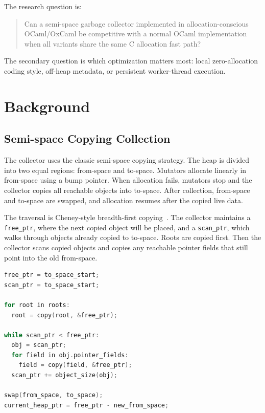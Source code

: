 \documentclass[11pt,a4paper]{article}
\begin{document}
The research question is:

\begin{quote}
Can a semi-space garbage collector implemented in allocation-conscious
OCaml/OxCaml be competitive with a normal OCaml implementation when all variants
share the same C allocation fast path?
\end{quote}

The secondary question is which optimization matters most: local zero-allocation
coding style, off-heap metadata, or persistent worker-thread execution.

\section{Background}
\label{sec:background}

\subsection{Semi-space Copying Collection}

The collector uses the classic semi-space copying strategy. The heap is divided
into two equal regions: from-space and to-space. Mutators allocate linearly in
from-space using a bump pointer. When allocation fails, mutators stop and the
collector copies all reachable objects into to-space. After collection,
from-space and to-space are swapped, and allocation resumes after the copied
live data.

The traversal is Cheney-style breadth-first copying~\cite{cheney1970}. The
collector maintains a \texttt{free\_ptr}, where the next copied object will be
placed, and a \texttt{scan\_ptr}, which walks through objects already copied to
to-space. Roots are copied first. Then the collector scans copied objects and
copies any reachable pointer fields that still point into the old from-space.

\begin{lstlisting}[language=C,caption={High-level semi-space collection sketch.},label={lst:cheney}]
free_ptr = to_space_start;
scan_ptr = to_space_start;

for root in roots:
  root = copy(root, &free_ptr);

while scan_ptr < free_ptr:
  obj = scan_ptr;
  for field in obj.pointer_fields:
    field = copy(field, &free_ptr);
  scan_ptr += object_size(obj);

swap(from_space, to_space);
current_heap_ptr = free_ptr - new_from_space;
\end{lstlisting}
\end{document}
